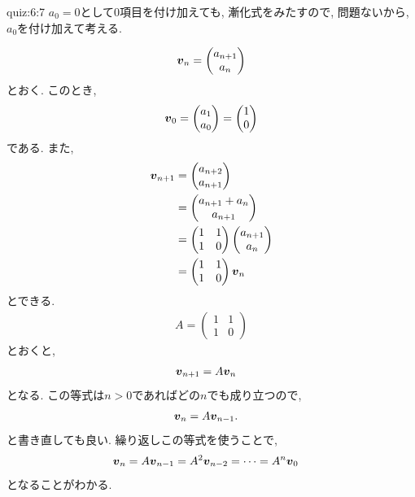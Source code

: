 \begin{answerof}{quiz:6:7}
$a_{0}=0$として$0$項目を付け加えても, 漸化式をみたすので,
問題ないから, $a_0$を付け加えて考える.

\begin{align*}
  \boldsymbol{v}_n=\begin{pmatrix}a_{n+1}\\a_n\end{pmatrix}
\end{align*}
とおく.
このとき,
\begin{align*}
  \boldsymbol{v}_0=\begin{pmatrix}a_{1}\\a_0\end{pmatrix}=\begin{pmatrix}1\\0\end{pmatrix}
\end{align*}
である.
また,
\begin{align*}
  \boldsymbol{v}_{n+1}
  &=\begin{pmatrix}a_{n+2}\\a_{n+1}\end{pmatrix}\\
  &=\begin{pmatrix}a_{n+1}+a_n\\a_{n+1}\end{pmatrix}\\
  &=\begin{pmatrix}1&1\\1&0\end{pmatrix}\begin{pmatrix}a_{n+1}\\a_n\end{pmatrix}\\
  &=\begin{pmatrix}1&1\\1&0\end{pmatrix}\boldsymbol{v}_n
\end{align*}
とできる.
\begin{align*}
A=\begin{pmatrix}1&1\\1&0\end{pmatrix}
\end{align*}
とおくと,
\begin{align*}
  \boldsymbol{v}_{n+1}
  &=A\boldsymbol{v}_{n}
\end{align*}
となる.
この等式は$n>0$であればどの$n$でも成り立つので,
\begin{align*}
  \boldsymbol{v}_{n}
  &=A\boldsymbol{v}_{n-1}.
\end{align*}
と書き直しても良い.
繰り返しこの等式を使うことで,
\begin{align*}
  \boldsymbol{v}_{n}&=A\boldsymbol{v}_{n-1}=A^2\boldsymbol{v}_{n-2}
  =\cdots=A^{n}\boldsymbol{v}_0
\end{align*}
となることがわかる.


\end{answerof}
